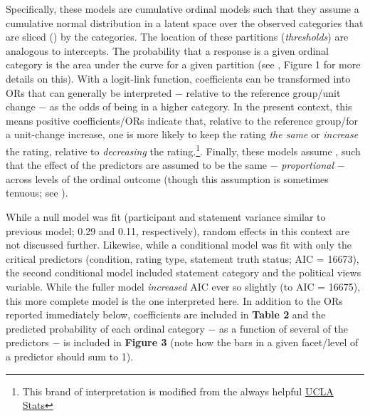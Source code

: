 \documentclass[12pt]{article}  %
\begin{document}
Specifically, these models are cumulative ordinal models such that they assume a cumulative normal distribution in a latent space over the observed categories that are sliced () by the categories. The location of these partitions (\textit{thresholds}) are analogous to intercepts. The probability that a response is a given ordinal category is the area under the curve for a given partition (see \textcite{burkner_ordinal_2019}, Figure 1 for more details on this). With a logit-link function, coefficients can be transformed into ORs that can generally be interpreted $-$ relative to the reference group/unit change $-$ as the odds of being in a higher category. In the present context, this means positive coefficients/ORs indicate that, relative to the reference group/for a unit-change increase, one is more likely to keep the rating \textit{the same} or \textit{increase} the rating, relative to \textit{decreasing} the rating.\footnote{This brand of interpretation is modified from the always helpful \href{https://stats.idre.ucla.edu/r/dae/ordinal-logistic-regression/}{UCLA Stats}}. Finally, these models assume , such that the effect of the predictors are assumed to be the same $-$ \textit{proportional} $-$ across levels of the ordinal outcome (though this assumption is sometimes tenuous; see \textcite{burkner_ordinal_2019}).

While a null model was fit (participant and statement variance similar to previous model; 0.29 and 0.11, respectively), random effects in this context are not discussed further. Likewise, while a conditional model was fit with only the critical predictors (condition, rating type, statement truth status; AIC = 16673), the second conditional model included statement category and the political views variable. While the fuller model \textit{increased} AIC ever so slightly (to AIC = 16675), this more complete model is the one interpreted here. In addition to the ORs reported immediately below, coefficients are included in \textbf{Table 2} and the predicted probability of each ordinal category $-$ as a function of several of the predictors $-$ is included in \textbf{Figure 3} (note how the bars in a given facet/level of a predictor should sum to 1).
\end{document}

